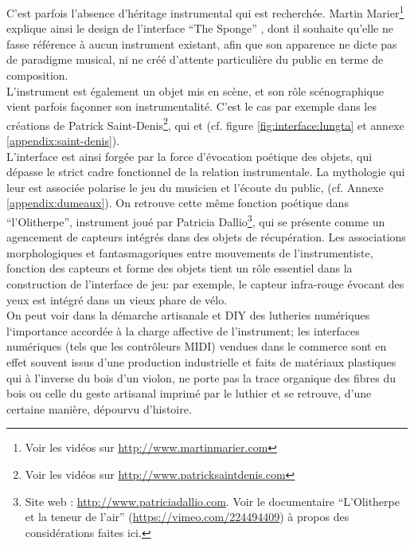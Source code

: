 \noindent C'est parfois l'absence d'héritage instrumental qui est recherchée. Martin Marier\footnote{Voir les vidéos sur \url{http://www.martinmarier.com}} explique ainsi le design de l'interface ``The Sponge'' \cite{marier_sponge_2010}, dont il souhaite qu'elle ne fasse référence à aucun instrument existant, afin que son apparence ne dicte pas de paradigme musical, ni ne créé d'attente particulière du public en terme de composition.\\
\indent L'instrument est également un objet mis en scène, et son rôle scénographique vient parfois façonner son instrumentalité. C'est le cas par exemple dans les créations de Patrick Saint-Denis\footnote{Voir les vidéos sur \url{http://www.patricksaintdenis.com}}, qui  et  (cf. figure \ref{fig:interface:lungta} et annexe \ref{appendix:saint-denis}).\\
\indent L'interface est ainsi forgée par la force d'évocation poétique des objets, qui dépasse le strict cadre fonctionnel de la relation instrumentale. La mythologie qui leur est associée polarise le jeu du musicien et l'écoute du public,  (cf. Annexe \ref{appendix:dumeaux}). On retrouve cette même fonction poétique dans ``l'Olitherpe'', instrument joué par Patricia Dallio\footnote{Site web : \url{http://www.patriciadallio.com}. Voir le documentaire ``L'Olitherpe et la teneur de l'air'' (\url{https://vimeo.com/224494409}) à propos des considérations faites ici.}, qui se présente comme un agencement de capteurs intégrés dans des objets de récupération. Les associations morphologiques et fantasmagoriques entre mouvements de l'instrumentiste, fonction des capteurs et forme des objets tient un rôle essentiel dans la construction de l'interface de jeu: par exemple, le capteur infra-rouge évocant des yeux est intégré dans un vieux phare de vélo.\\
\indent On peut voir dans la démarche artisanale et \gls{DIY} des lutheries numériques l`importance accordée à la charge affective de l'instrument; les interfaces numériques (tels que les contrôleurs \gls{MIDI}) vendues dans le commerce sont en effet souvent issus d'une production industrielle et faits de matériaux plastiques qui à l'inverse du bois d'un violon, ne porte pas la trace organique des fibres du bois ou celle du geste artisanal imprimé par le luthier et se retrouve, d'une certaine manière, dépourvu d'histoire.

